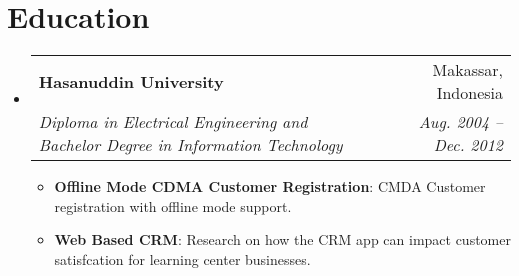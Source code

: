 \documentclass[letterpaper,13pt]{article}
\makeatletter
\newcommand{\resumeItem}[2]{
  \item\small{
    \textbf{#1}{: #2 \vspace{-2pt}}
  }
}
\newcommand{\resumeSubheading}[4]{
  \vspace{-1pt}\item
    \begin{tabular*}{0.97\textwidth}[t]{l@{\extracolsep{\fill}}r}
      \textbf{#1} & #2 \\
      \textit{\small#3} & \textit{\small #4} \\
    \end{tabular*}\vspace{-5pt}
}
\newcommand{\resumeSubHeadingListStart}{\begin{itemize}[leftmargin=*]}
\newcommand{\resumeSubHeadingListEnd}{\end{itemize}}
\newcommand{\resumeItemListStart}{\begin{itemize}}
\newcommand{\resumeItemListEnd}{\end{itemize}\vspace{-4pt}}
\makeatother
\begin{document}
\section{Education}
  \resumeSubHeadingListStart
    \resumeSubheading
      {Hasanuddin University}{Makassar, Indonesia}
      {Diploma in Electrical Engineering and Bachelor Degree in Information Technology}{Aug. 2004 -- Dec. 2012}
      \resumeItemListStart
        \resumeItem{Offline Mode CDMA Customer Registration}
          {CMDA Customer registration with offline mode support.}
        \resumeItem{Web Based CRM}
          {Research on how the CRM app can impact customer satisfcation for learning center businesses.}
      \resumeItemListEnd



  \resumeSubHeadingListEnd

\end{document}
